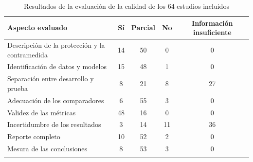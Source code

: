 \begin{table}[t]
\caption{Resultados de la evaluación de la calidad de los 64 estudios incluidos}\label{tab:calidadres}
\footnotesize
\begin{tabular*}{\textwidth}{@{\extracolsep\fill}lcccc@{}}
\toprule
Aspecto evaluado & Sí & Parcial & No & Información insuficiente \\
\midrule
Descripción de la protección y la contramedida & 14 & 50 & 0 & 0 \\
Identificación de datos y modelos & 15 & 48 & 1 & 0 \\
Separación entre desarrollo y prueba & 8 & 21 & 8 & 27 \\
Adecuación de los comparadores & 6 & 55 & 3 & 0 \\
Validez de las métricas & 48 & 16 & 0 & 0 \\
Incertidumbre de los resultados & 3 & 14 & 11 & 36 \\
Reporte completo & 10 & 52 & 2 & 0 \\
Mesura de las conclusiones & 8 & 53 & 3 & 0 \\
\botrule
\end{tabular*}
\end{table}
